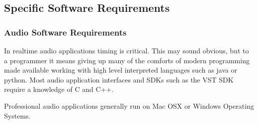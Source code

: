 \subsection{Specific Software Requirements}

\subsubsection{Audio Software Requirements}

In realtime audio applications timing is critical. This may sound obvious, but to a programmer it means giving up many of the comforts of modern programming made available working with high level interpreted languages such as java or python. Most audio application interfaces and SDKs such as the VST SDK require a knowledge of C and C++.

Professional audio applications generally run on Mac OSX or Windows Operating Systems.


